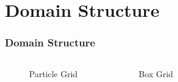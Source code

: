 \section{Domain Structure}
\begin{frame}
    \frametitle{Domain Structure}
    \begin{columns}
        \begin{figure}[h]
            \resizebox{.9\textwidth}{!}{%
                
            }
            \caption{Particle Grid}
        \end{figure}

        \begin{figure}[h]
            \resizebox{.9\textwidth}{!}{%
                
            }
            \caption{Box Grid}
        \end{figure}
    \end{columns}
\end{frame}

